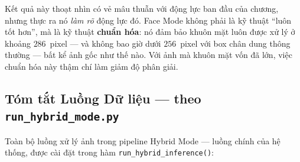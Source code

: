 Kết quả này thoạt nhìn có vẻ mâu thuẫn với động lực ban đầu của chương, nhưng thực ra nó \textit{làm rõ} động lực đó. Face Mode không phải là kỹ thuật ``luôn tốt hơn'', mà là kỹ thuật \textbf{chuẩn hóa}: nó đảm bảo khuôn mặt luôn được xử lý ở khoảng $286$~pixel --- và không bao giờ dưới $256$~pixel với box chân dung thông thường --- bất kể ảnh gốc như thế nào. Với ảnh mà khuôn mặt vốn đã lớn, việc chuẩn hóa này thậm chí làm giảm độ phân giải.

\subsection{Tóm tắt Luồng Dữ liệu --- theo \texttt{run\_hybrid\_mode.py}}
\label{subsec:full_pipeline}

Toàn bộ luồng xử lý ảnh trong pipeline Hybrid Mode --- luồng chính của hệ thống, được cài đặt trong hàm \texttt{run\_hybrid\_inference()}:

